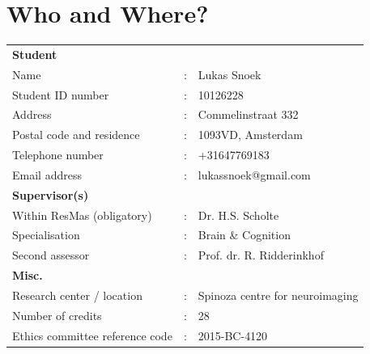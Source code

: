 \documentclass[12pt,a4paper]{article}\usepackage[]{graphicx}\usepackage[]{color}
\begin{document}



\newcommand\wordcount{\immediate\write18{texcount -sub=section \jobname.tex  | grep "Section" | sed -e 's/+.*//' | sed -n \thesection p > 'count.txt'}Word count: }

\onehalfspacing

\section{Who and Where?}
\vspace{\baselineskip}

\begin{tabular}{l l l}
\textbf{Student} \\
Name & : &                              Lukas Snoek\\
Student ID number & : &                 10126228 \\
Address & : &                           Commelinstraat 332 \\
Postal code and residence & : &         1093VD, Amsterdam \\
Telephone number & : &                  +31647769183 \\
Email address & : &                     lukassnoek@gmail.com \\[0.5cm]

\textbf{Supervisor(s)} \\
Within ResMas (obligatory) & : &        Dr. H.S. Scholte \\
Specialisation & : &                    Brain \& Cognition \\
Second assessor & : &                   Prof. dr. R. Ridderinkhof \\[0.5cm]

\textbf{Misc.} \\
Research center / location & : &        Spinoza centre for neuroimaging \\
Number of credits & : &                 28 \\
Ethics committee reference code & : &   2015-BC-4120 \\

\end{tabular}
\end{document}
